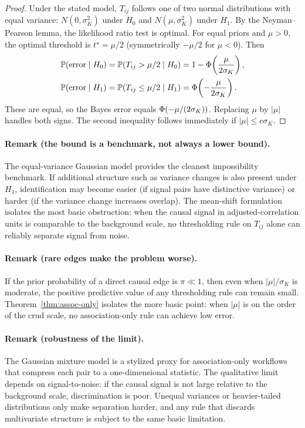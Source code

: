 \begin{proof}
Under the stated model, $T_{ij}$ follows one of two normal distributions with equal variance:
$N(0,\sigma_K^2)$ under $H_0$ and $N(\mu,\sigma_K^2)$ under $H_1$.
By the Neyman--Pearson lemma, the likelihood ratio test is optimal. For equal priors and $\mu>0$,
the optimal threshold is $t^\star=\mu/2$ (symmetrically $-\mu/2$ for $\mu<0$). Then
\begin{align}
\mathbb{P}(\text{error}\mid H_0) &= \mathbb{P}(T_{ij}>\mu/2\mid H_0) = 1-\Phi\!\left(\frac{\mu}{2\sigma_K}\right),\\
\mathbb{P}(\text{error}\mid H_1) &= \mathbb{P}(T_{ij}\le\mu/2\mid H_1) = \Phi\!\left(-\frac{\mu}{2\sigma_K}\right).
\end{align}
These are equal, so the Bayes error equals $\Phi(-\mu/(2\sigma_K))$. Replacing $\mu$ by $|\mu|$ handles both signs.
The second inequality follows immediately if $|\mu|\le c\sigma_K$.
\end{proof}

\paragraph{Remark (the bound is a benchmark, not always a lower bound).}
The equal-variance Gaussian model provides the cleanest impossibility benchmark.
If additional structure such as variance changes is also present under $H_1$, identification may become easier (if signal pairs have distinctive variance) or harder (if the variance change increases overlap).
The mean-shift formulation isolates the most basic obstruction: when the causal signal in adjusted-correlation units is comparable to the background scale, no thresholding rule on $T_{ij}$ alone can reliably separate signal from noise.

\paragraph{Remark (rare edges make the problem worse).}
If the prior probability of a direct causal edge is $\pi\ll 1$, then even when $|\mu|/\sigma_K$ is moderate,
the positive predictive value of any thresholding rule can remain small.
Theorem~\ref{thm:assoc-only} isolates the more basic point: when $|\mu|$ is on the order of the crud scale,
no association-only rule can achieve low error.

\paragraph{Remark (robustness of the limit).}
The Gaussian mixture model is a stylized proxy for association-only workflows that compress each pair to a
one-dimensional statistic. The qualitative limit depends on signal-to-noise: if the causal signal is not
large relative to the background scale, discrimination is poor. Unequal variances or heavier-tailed
distributions only make separation harder, and any rule that discards multivariate structure is subject
to the same basic limitation.

